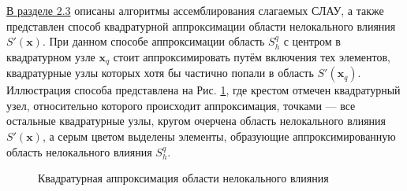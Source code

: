 \underline{В разделе 2.3} описаны алгоритмы ассемблирования слагаемых СЛАУ, а также представлен способ квадратурной аппроксимации области нелокального влияния $S'(\boldsymbol{x})$. При данном способе аппроксимации область $S_h^q$ с центром в квадратурном узле $\boldsymbol{x}_q$ стоит аппроксимировать путём включения тех элементов, квадратурные узлы которых хотя бы частично попали в область $S'(\boldsymbol{x}_q)$. Иллюстрация способа представлена на Рис. \ref{fig:ApproxSQ}, где крестом отмечен квадратурный узел, относительно которого происходит аппроксимация, точками --- все остальные квадратурные узлы, кругом очерчена область нелокального влияния $S'(\boldsymbol{x})$, а серым цветом выделены элементы, образующие аппроксимированную область нелокального влияния $S_h^q$.

\begin{figure}[ht]
    \caption{Квадратурная аппроксимация области нелокального влияния}\label{fig:ApproxSQ}
\end{figure}

